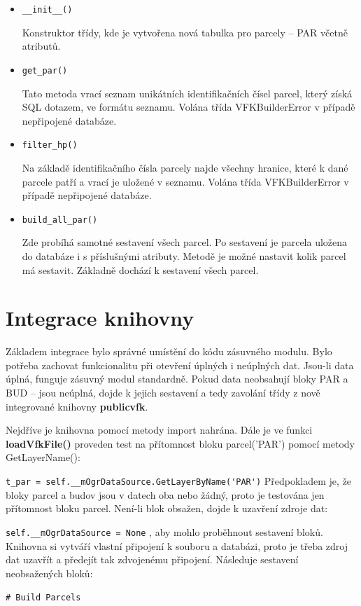 \begin{itemize}
\item \verb|__init__()|

Konstruktor třídy, kde je vytvořena nová tabulka pro parcely -- PAR včetně atributů.
\item \verb|get_par()|
		
Tato metoda vrací seznam unikátních identifikačních čísel parcel, který získá SQL dotazem, ve formátu seznamu. Volána třída VFKBuilderError v případě nepřipojené databáze.
\item \verb|filter_hp()|

Na základě identifikačního čísla parcely najde všechny hranice, které k dané parcele patří a vrací je uložené v seznamu. Volána třída VFKBuilderError v případě nepřipojené databáze.
\item \verb|build_all_par()|

Zde probíhá samotné sestavení všech parcel. Po sestavení je parcela uložena do databáze i s příslušnými atributy. Metodě je možné nastavit kolik parcel má sestavit. Základně dochází k sestavení všech parcel.

\end{itemize}
\section{Integrace knihovny}
Základem integrace bylo správné umístění do kódu zásuvného modulu. Bylo potřeba zachovat funkcionalitu při otevření úplných i neúplných dat. Jsou-li data úplná, funguje zásuvný modul standardně. Pokud data neobsahují bloky PAR a BUD -- jsou neúplná, dojde k jejich sestavení a tedy zavolání třídy z nově integrované knihovny \textbf{publicvfk}.

Nejdříve je knihovna pomocí metody import nahrána. Dále je ve funkci \textbf{loadVfkFile()} proveden test na přítomnost bloku parcel('PAR') pomocí metody GetLayerName():

\verb|t_par = self.__mOgrDataSource.GetLayerByName('PAR')|
Předpokladem je, že bloky parcel a budov jsou v datech oba nebo žádný, proto je testována jen přítomnost bloku parcel. Není-li blok obsažen, dojde k uzavření zdroje dat:

\verb|self.__mOgrDataSource = None|
, aby mohlo proběhnout sestavení bloků. Knihovna si vytváří vlastní připojení k  souboru a databázi, proto je třeba zdroj dat uzavřít a předejít tak zdvojenému připojení. Následuje sestavení neobsažených bloků:

\verb|# Build Parcels|

